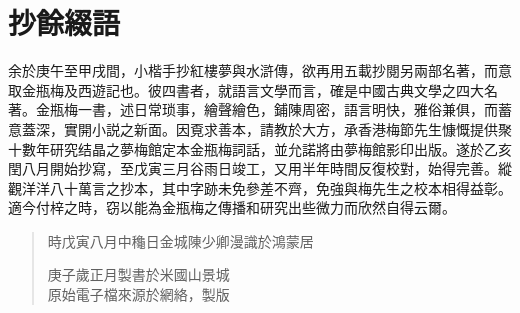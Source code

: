 \chapter*{抄餘綴語}


余於庚午至甲戌間，小楷手抄紅樓夢與水滸傳，欲再用五載抄閱另兩部名著，而意取金瓶梅及西遊記也。彼四書者，就語言文學而言，確是中國古典文學之四大名著。金瓶梅一書，述日常琐事，繪聲繪色，鋪陳周密，語言明快，雅俗兼俱，而蓄意蓋深，實開小説之新面。因覔求善本，請教於大方，承香港梅節先生慷慨提供聚十數年研究结晶之夢梅館定本金瓶梅詞話，並允諾將由夢梅館影印出版。遂於乙亥閏八月開始抄寫，至戊寅三月谷雨日竣工，又用半年時間反復校對，始得完善。縱觀洋洋八十萬言之抄本，其中字跡未免參差不齊，免強與梅先生之校本相得益彰。適今付梓之時，窃以能為金瓶梅之傳播和研究出些微力而欣然自得云爾。

\begin{quotation}
\begin{flushright}時戊寅八月中龝日金城陳少卿漫識於鴻蒙居\end{flushright}

\small\color{gray}
\begin{flushright}
庚子歲正月製書於米國山景城\\
原始電子檔來源於網絡，\quad{\LaTeX}製版
\end{flushright}
\end{quotation}

{\insertauthorlog}



